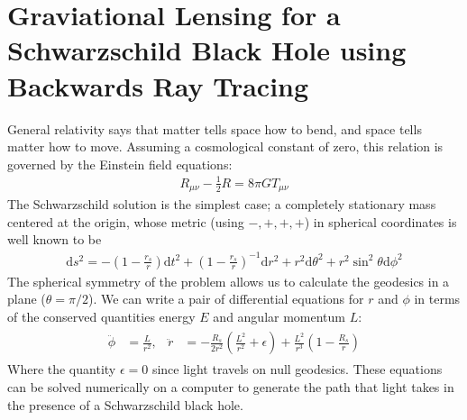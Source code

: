 \documentclass{article}
\begin{document}
\section*{Graviational Lensing for a Schwarzschild Black Hole using Backwards Ray Tracing}
	General relativity says that matter tells space how to bend, and space tells matter how to move. Assuming a cosmological constant of zero, this relation is governed by the Einstein field equations:
	\begin{align}
		R_{\mu\nu}-\frac{1}{2}R=8\pi G T_{\mu\nu}
	\end{align}
	The Schwarzschild solution is the simplest case; a completely stationary mass centered at the origin, whose metric (using \(-,+,+,+\)) in spherical coordinates is well known to be
	\begin{align}
		\mathrm{d}s^{2}=-\left(1-\frac{r_{s}}{r}\right)\mathrm{d}t^{2}+\left(1-\frac{r_{s}}{r}\right)^{-1}\mathrm{d}r^{2}+r^{2}\mathrm{d}\theta^{2}+r^{2}\sin^{2}\theta\mathrm{d}\phi^{2}
	\end{align}
	The spherical symmetry of the problem allows us to calculate the geodesics in a plane (\(\theta=\pi/2\)). We can write a pair of differential equations for \(r\) and \(\phi\) in terms of the conserved quantities energy \(E\) and angular momentum \(L\):
	\begin{align}\label{eq:eom}
		\begin{aligned}
			\ddot{\phi}&=\frac{L}{r^{2}}, & \ddot{r}&=-\frac{R_{s}}{2r^{2}}\left(\frac{L^{2}}{r^{2}}+\epsilon\right)+\frac{L^{2}}{r^{3}}\left(1-\frac{R_{s}}{r}\right)
		\end{aligned}
	\end{align}
	Where the quantity \(\epsilon=0\) since light travels on null geodesics. These equations can be solved numerically on a computer to generate the path that light takes in the presence of a Schwarzschild black hole. 
	
\end{document}
